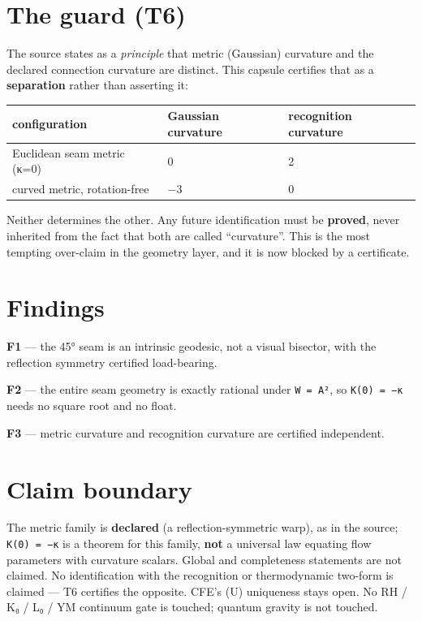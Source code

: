 \hypertarget{the-guard-t6}{%
\section{The guard (T6)}\label{the-guard-t6}}

The source states as a \emph{principle} that metric (Gaussian) curvature and
the declared connection curvature are distinct. This capsule certifies
that as a \textbf{separation} rather than asserting it:

\begin{longtable}[]{@{}lll@{}}
\toprule\noalign{}
configuration & Gaussian curvature & recognition curvature \\
\midrule\noalign{}
\endhead
\bottomrule\noalign{}
\endlastfoot
Euclidean seam metric (κ=0) & 0 & 2 \\
curved metric, rotation-free & −3 & 0 \\
\end{longtable}

Neither determines the other. Any future identification must be \textbf{proved},
never inherited from the fact that both are called ``curvature''. This is
the most tempting over-claim in the geometry layer, and it is now blocked
by a certificate.

\hypertarget{findings}{%
\section{Findings}\label{findings}}

\textbf{F1} --- the 45° seam is an intrinsic geodesic, not a visual bisector, with
the reflection symmetry certified load-bearing.

\textbf{F2} --- the entire seam geometry is exactly rational under \texttt{W\ =\ A²}, so
\texttt{K(0)\ =\ −κ} needs no square root and no float.

\textbf{F3} --- metric curvature and recognition curvature are certified
independent.

\hypertarget{claim-boundary}{%
\section{Claim boundary}\label{claim-boundary}}

The metric family is \textbf{declared} (a reflection-symmetric warp), as in the
source; \texttt{K(0)\ =\ −κ} is a theorem for this family, \textbf{not} a universal law
equating flow parameters with curvature scalars. Global and completeness
statements are not claimed. No identification with the recognition or
thermodynamic two-form is claimed --- T6 certifies the opposite. CFE's
(U) uniqueness stays open. No RH / K₀ / L₀ / YM continuum gate is
touched; quantum gravity is not touched.

